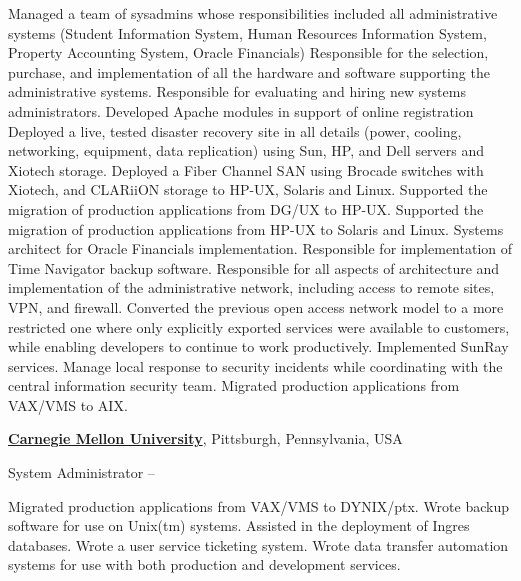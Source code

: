 \documentclass[letterpaper,10pt,oneside]{article}
\begin{document}
\begin{body}
\begin{detail}
\BulletItem
Managed a team of sysadmins whose responsibilities included all administrative systems (Student Information System, Human Resources Information System, Property Accounting System, Oracle Financials)
\BulletItem
Responsible for the selection, purchase, and implementation of all the hardware and software supporting the administrative systems.
\BulletItem
Responsible for evaluating and hiring new systems administrators.
\BulletItem
Developed Apache modules in support of online registration
\BulletItem
Deployed a live, tested disaster recovery site in all details (power, cooling, networking, equipment, data replication) using Sun, HP, and Dell servers and Xiotech storage. Deployed a Fiber Channel SAN using Brocade switches with Xiotech, and CLARiiON storage to HP-UX, Solaris and Linux.
\BulletItem
Supported the migration of production applications from DG/UX to HP-UX.
\BulletItem
Supported the migration of production applications from HP-UX to Solaris and Linux. Systems architect for Oracle Financials implementation.
\BulletItem
Responsible for implementation of Time Navigator backup software.
\BulletItem
Responsible for all aspects of architecture and implementation of the administrative network, including access to remote sites, VPN, and firewall.
\BulletItem
Converted the previous open access network model to a more restricted one where only explicitly exported services were available to customers, while enabling developers to continue to work productively.
\BulletItem
Implemented SunRay services.
\BulletItem
Manage local response to security incidents while coordinating with the central information security team.
\BulletItem
Migrated production applications from VAX/VMS to AIX.

\end{detail}
\EntryGap


\href{http://www.cmu.edu/}
{\textbf{Carnegie Mellon University}},
Pittsburgh, Pennsylvania, USA
\par
System Administrator
\hfill
{} -- 

\begin{detail}
\BulletItem
Migrated production applications from VAX/VMS to DYNIX/ptx. Wrote backup software for use on Unix(tm) systems.
\BulletItem
Assisted in the deployment of Ingres databases.
\BulletItem
Wrote a user service ticketing system.
\BulletItem
Wrote data transfer automation systems for use with both production and development services.


\end{detail}
\end{body}
\end{document}
